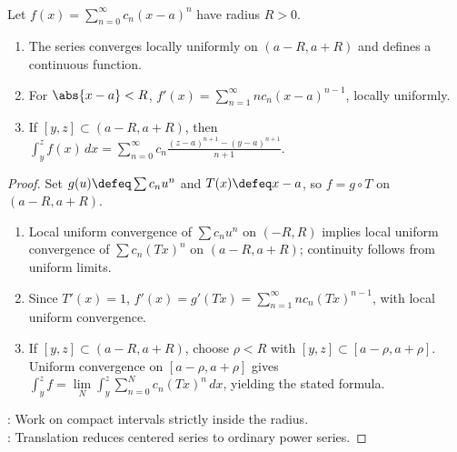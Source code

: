 \begin{corollary} \label{cor:centered-power-series-termwise-calculus} \\
Let $f(x)=\sum\limits_{n=0}^{\infty}c_n(x-a)^n$ have radius $R>0$.
\begin{enumerate}[label=(\roman*)]
\setlength{\itemsep}{0pt}
\item The series converges locally uniformly on $(a-R,a+R)$ and defines a continuous function.
\item For $\abs{x-a}<R$, $f'(x)=\sum\limits_{n=1}^{\infty}n c_n(x-a)^{n-1}$, locally uniformly.
\item If $[y,z]\subset(a-R,a+R)$, then $\int_y^z f(x)\,dx=\sum\limits_{n=0}^{\infty}c_n\frac{(z-a)^{n+1}-(y-a)^{n+1}}{n+1}$.
\end{enumerate}
\begin{proof}
Set $g(u)\defeq\sum c_nu^n$ and $T(x)\defeq x-a$, so $f=g\circ T$ on $(a-R,a+R)$.
\begin{enumerate}[label=(\roman*)]
\setlength{\itemsep}{0pt}
\item Local uniform convergence of $\sum c_nu^n$ on $(-R,R)$ implies local uniform convergence of $\sum c_n(Tx)^n$ on $(a-R,a+R)$; continuity follows from uniform limits.
\item Since $T'(x)=1$, $f'(x)=g'(Tx)=\sum\limits_{n=1}^{\infty}n c_n(Tx)^{n-1}$, with local uniform convergence.
\item If $[y,z]\subset(a-R,a+R)$, choose $\rho<R$ with $[y,z]\subset[a-\rho,a+\rho]$.\\
Uniform convergence on $[a-\rho,a+\rho]$ gives $\int_y^z f=\lim\limits_N\int_y^z\sum\limits_{n=0}^{N}c_n(Tx)^n\,dx$, yielding the stated formula.
\end{enumerate}
: Work on compact intervals strictly inside the radius.\\
: Translation reduces centered series to ordinary power series.
\end{proof}
\end{corollary}

